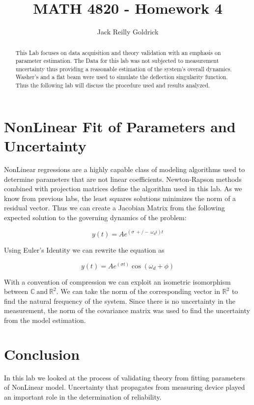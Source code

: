\documentclass[]{report}
\title{MATH 4820 - Homework 4}
\author{Jack Reilly Goldrick}
\begin{document}
\maketitle


\begin{abstract}
This Lab focuses on data acquisition and theory validation with an emphasis on parameter estimation.  The Data for this lab was not subjected to measurement uncertainty thus providing a reasonable estimation of the system's overall dynamics.  Washer's and a flat beam were used to simulate the deflection singularity function.  Thus the following lab will discuss the procedure used and results analyzed.
\end{abstract}


\section{NonLinear Fit of Parameters and Uncertainty}

NonLinear regressions are  a highly capable class of modeling algorithms used to determine parameters that are not linear coefficients.  Newton-Rapson methods combined with projection matrices define the algorithm used in this lab.  As we know from previous labs,  the least squares solutions minimizes the norm of a residual vector.   Thus we  can create a Jacobian Matrix  from the following expected solution to the governing dynamics of the problem:  

$$  y(t) = A e^{ (\sigma  \ +/- \  \omega_d i) t} $$

Using Euler's Identity we can rewrite the equation as


$$ y(t) = A e^{ (\sigma  t)} \cos(\omega_d + \phi) $$

With a convention of compression we can exploit an isometric isomorphism between $\mathbb{C}  \  \text{and}  \  \mathbb{R}^2$.  We can take the norm of the corresponding vector in $\mathbb{R}^2$ to find the natural frequency of the system.   Since there is no uncertainty in the measurement, the  norm of the covariance matrix was used to find the uncertainty from the model estimation.  


\section{Conclusion}


In this lab we looked at the process of validating theory from fitting parameters of NonLinear model.  Uncertainty that propagates from measuring device played an important role in the determination of reliability.  
\end{document}
